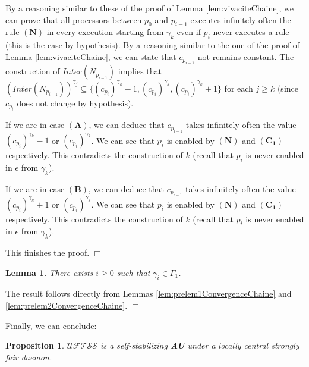 \documentclass[11pt,english,letterpaper]{article}
\newtheorem{lemma}{Lemma}
\newtheorem{proposition}{Proposition}
\newenvironment{proof}{{\noindent\bf Proof. } }{{\hfill $\Box$}}
\begin{document}
\begin{proof}
By a reasoning similar to these of the proof of Lemma \ref{lem:vivaciteChaine}, we can prove that all processors between $p_{0}$ and $p_{i-1}$ executes infinitely often the rule $\boldsymbol{(N)}$ in every execution starting from $\gamma_{k}$ even if $p_{i}$ never executes a rule (this is the case by hypothesis). By a reasoning similar to the one of the proof of Lemma \ref{lem:vivaciteChaine}, we can state that $c_{p_{i-1}}$ not remains constant. The construction of $Inter(N_{p_{i-1}})$ implies that  $\left(Inter(N_{p_{i-1}})\right)^{\gamma_{j}}\subseteq\{\left(c_{p_{i}}\right)^{\gamma_{k}}-1,\left(c_{p_{i}}\right)^{\gamma_{k}},\left(c_{p_{i}}\right)^{\gamma_{k}}+1\}$ for each $j\geq k$ (since $c_{p_{i}}$ does not change by hypothesis).

If we are in case $\boldsymbol{(A)}$, we can deduce that $c_{p_{i-1}}$ takes infinitely often the value $\left(c_{p_{i}}\right)^{\gamma_{k}}-1$ or $\left(c_{p_{i}}\right)^{\gamma_{k}}$. We can see that $p_{i}$ is enabled by $\boldsymbol{(N)}$ and $\boldsymbol{(C_{1})}$ respectively. This contradicts the construction of $k$ (recall that $p_{i}$ is never enabled in $\epsilon$ from $\gamma_{k}$).

If we are in case $\boldsymbol{(B)}$, we can deduce that $c_{p_{i-1}}$  takes infinitely often the value $\left(c_{p_{i}}\right)^{\gamma_{k}}+1$ or $\left(c_{p_{i}}\right)^{\gamma_{k}}$. We can see that $p_{i}$ is enabled by $\boldsymbol{(N)}$ and $\boldsymbol{(C_{1})}$ respectively. This contradicts the construction of $k$ (recall that $p_{i}$ is never enabled in $\epsilon$ from $\gamma_{k}$).
				
This finishes the proof.
\end{proof}

\begin{lemma}\label{lem:convergenceChaine}
There exists $i\geq 0$ such that $\gamma_{i}\in\Gamma_{1}$.
\end{lemma}

\begin{proof}
The result follows directly from Lemmas \ref{lem:prelem1ConvergenceChaine} and \ref{lem:prelem2ConvergenceChaine}.
\end{proof}

Finally, we can conclude:

\begin{proposition}\label{prop:SSChaine}
$\mathcal{UFTSS}$ is a self-stabilizing \textbf{AU} under a locally central strongly fair daemon.
\end{proposition}
\end{document}
